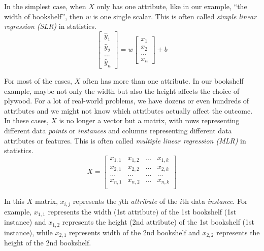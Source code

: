 \documentclass[
	letterpaper
]{article}
\begin{document}
In the simplest case, when $X$ only has one attribute, like in our example, ``the width of bookshelf'', then $w$ is one single scalar.
This is often called \textit{simple linear regression (SLR)} in statistics.
\begin{equation}
\begin{bmatrix}\hat y_1 \\ \hat y_2 \\ ... \\ \hat y_n\end{bmatrix}
 = w\begin{bmatrix} x_1 \\  x_2 \\ ... \\ x_n\end{bmatrix}+b
\end{equation}

For most of the cases, $X$ often has more than one attribute. 
In our bookshelf example, maybe not only the width but also the height affects the choice of plywood.
For a lot of real-world problems, we have dozens or even hundreds of attributes and we might not know which attributes actually affect the outcome.
In these cases, $X$ is no longer a vector but a matrix, with rows representing different data \textit{points} or \textit{instances} and columns representing different data attributes or features.
This is often called \textit{multiple linear regression (MLR)} in statistics.
\begin{equation}
X =
\begin{bmatrix}
x_{1, 1} & x_{1, 2} & ... & x_{1, k} \\
x_{2, 1} & x_{2, 2} & ... & x_{2, k} \\
... & ... & ... & ... \\
x_{n, 1} & x_{n, 2} & ... & x_{n, k} \\
\end{bmatrix}
\end{equation}

In this $X$ matrix, $x_{i, j}$ represents the $j$th \textit{attribute} of the $i$th data \textit{instance}.
For example, $x_{1, 1}$ represents the width (1st attribute) of the 1st bookshelf (1st instance) and $x_{1, 2}$ represents the height (2nd attribute) of the 1st bookshelf (1st instance), while $x_{2, 1}$ represents width of the 2nd bookshelf and $x_{2, 2}$ represents the height of the 2nd bookshelf.
\end{document}
